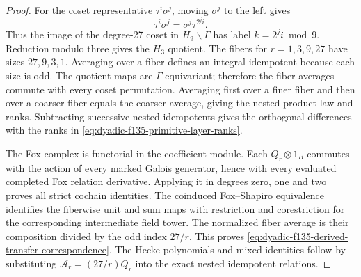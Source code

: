 \begin{proof}
For the coset
representative
$\tau^i\sigma^j$,
moving $\sigma^j$
to the left gives
\[
\tau^i\sigma^j
=\sigma^j\tau^{2^j i}.
\]
Thus the image
of the degree-27
coset in
$H_9\backslash\Gamma$
has label
$k=2^ji\bmod9$.
Reduction modulo
three gives the
$H_3$ quotient.
The fibers for
$r=1,3,9,27$
have sizes
$27,9,3,1$.
Averaging over
a fiber defines
an integral
idempotent because
each size is odd.
The quotient maps
are $\Gamma$-equivariant;
therefore the fiber
averages commute
with every coset
permutation.
Averaging first
over a finer
fiber and then
over a coarser
fiber equals the
coarser average,
giving the
nested product
law and ranks.
Subtracting
successive
nested idempotents
gives the
orthogonal
differences
with the ranks
in
\eqref{eq:dyadic-f135-primitive-layer-ranks}.

The Fox complex
is functorial in
the coefficient
module.
Each $Q_r\otimes1_B$
commutes with
the action of
every marked
Galois generator,
hence with
every evaluated
completed Fox
relation derivative.
Applying it in
degrees zero,
one and two
proves all strict
cochain identities.
The coinduced
Fox--Shapiro
equivalence
identifies the
fiberwise unit
and sum maps
with restriction
and corestriction
for the corresponding
intermediate
field tower.
The normalized
fiber average
is their
composition
divided by
the odd index
$27/r$.
This proves
\eqref{eq:dyadic-f135-derived-transfer-correspondence}.
The Hecke
polynomials
and mixed
identities
follow by
substituting
$\mathcal A_r=(27/r)Q_r$
into the exact
nested
idempotent
relations.
\end{proof}

